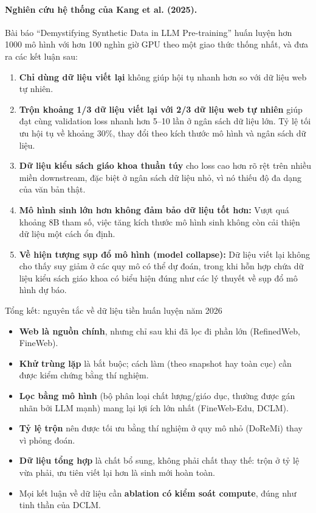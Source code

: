 \paragraph{Nghiên cứu hệ thống của Kang et al. (2025).} Bài báo “Demystifying Synthetic Data in LLM Pre-training” \cite{kang2025synthetic} huấn luyện hơn 1000 mô hình với hơn 100 nghìn giờ GPU theo một giao thức thống nhất, và đưa ra các kết luận sau:
\begin{enumerate}
	\item \textbf{Chỉ dùng dữ liệu viết lại} không giúp hội tụ nhanh hơn so với dữ liệu web tự nhiên.
	\item \textbf{Trộn khoảng 1/3 dữ liệu viết lại với 2/3 dữ liệu web tự nhiên} giúp đạt cùng validation loss nhanh hơn 5--10 lần ở ngân sách dữ liệu lớn. Tỷ lệ tối ưu hội tụ về khoảng 30\%, thay đổi theo kích thước mô hình và ngân sách dữ liệu.
	\item \textbf{Dữ liệu kiểu sách giáo khoa thuần túy} cho loss cao hơn rõ rệt trên nhiều miền downstream, đặc biệt ở ngân sách dữ liệu nhỏ, vì nó thiếu độ đa dạng của văn bản thật.
	\item \textbf{Mô hình sinh lớn hơn không đảm bảo dữ liệu tốt hơn:} Vượt quá khoảng 8B tham số, việc tăng kích thước mô hình sinh không còn cải thiện dữ liệu một cách ổn định.
	\item \textbf{Về hiện tượng sụp đổ mô hình (model collapse):} Dữ liệu viết lại không cho thấy suy giảm ở các quy mô có thể dự đoán, trong khi hỗn hợp chứa dữ liệu kiểu sách giáo khoa có biểu hiện đúng như các lý thuyết về sụp đổ mô hình dự báo.
\end{enumerate}

\begin{assess}{Tổng kết: nguyên tắc về dữ liệu tiền huấn luyện năm 2026}
\begin{itemize}
	\item \textbf{Web là nguồn chính}, nhưng chỉ sau khi đã lọc đi phần lớn (RefinedWeb, FineWeb).
	\item \textbf{Khử trùng lặp} là bắt buộc; cách làm (theo snapshot hay toàn cục) cần được kiểm chứng bằng thí nghiệm.
	\item \textbf{Lọc bằng mô hình} (bộ phân loại chất lượng/giáo dục, thường được gán nhãn bởi LLM mạnh) mang lại lợi ích lớn nhất (FineWeb-Edu, DCLM).
	\item \textbf{Tỷ lệ trộn} nên được tối ưu bằng thí nghiệm ở quy mô nhỏ (DoReMi) thay vì phỏng đoán.
	\item \textbf{Dữ liệu tổng hợp} là chất bổ sung, không phải chất thay thế: trộn ở tỷ lệ vừa phải, ưu tiên viết lại hơn là sinh mới hoàn toàn.
	\item Mọi kết luận về dữ liệu cần \textbf{ablation có kiểm soát compute}, đúng như tinh thần của DCLM.
\end{itemize}
\end{assess}
